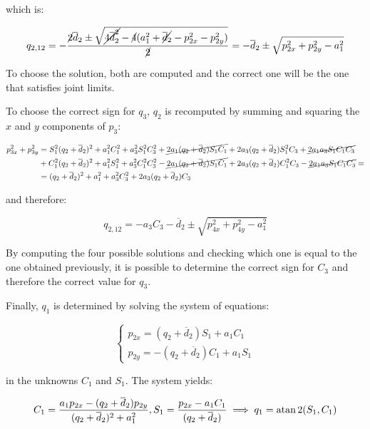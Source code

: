 which is:

\begin{equation*}
q_{2,12}=-\frac{\cancel{2}\overline d_2\pm\sqrt{\cancel{4\overline d_2^2}-\cancel{4}(a_1^2+\cancel{\overline d_2}-p_{2x}^2-p_{2y}^2)}}{\cancel{2}}=-\overline d_2\pm\sqrt{p_{2x}^2+p_{2y}^2-a_1^2}
\end{equation*}

To choose the solution, both are computed and the correct one will be the one that satisfies joint limits.

To choose the correct sign for $q_3$, $q_2$ is recomputed by summing and squaring the $x$ and $y$ components of $p_3$:

\begin{align*}
p_{3x}^2+p_{3y}^2&=S_1^2(q_2+\overline d_2)^2+a_1^2C_1^2+a_3^2S_1^2C_3^2+\cancel{2a_1(q_2+\overline d_2)S_1C_1}+2a_3(q_2+\overline d_2)S_1^2C_3+\cancel{2a_1a_3S_1C_1C_3}\\&+C_1^2(q_2+\overline d_2)^2+a_1^2S_1^2+a_3^2C_1^2C_3^2-\cancel{2a_1(q_2+\overline d_2)S_1C_1}+2a_3(q_2+\overline d_2)C_1^2C_3-\cancel{2a_1a_3S_1C_1C_3}=\\
&=(q_2+\overline d_2)^2+a_1^2+a_3^2C_3^2+2a_3(q_2+\overline d_2)C_3
\end{align*}

and therefore:

\begin{equation*}
q_{2,12}= -a_3C_3-\overline d_2\pm\sqrt{p_{4x}^2+p_{4y}^2-a_1^2}
\end{equation*}

By computing the four possible solutions and checking which one is equal to the one obtained previously, it is possible to determine the correct sign for $C_3$ and therefore the correct value for $q_3$.

Finally, $q_1$ is determined by solving the system of equations:

\begin{equation*}
\begin{cases}
p_{2x}=(q_2+\overline d_2)S_1+a_1C_1\\
p_{2y}=-(q_2+\overline d_2)C_1+a_1S_1
\end{cases}
\end{equation*}

in the unknowns $C_1$ and $S_1$. The system yields:

\begin{equation*}
C_1 = \frac{a_1p_{2x}-(q_2+\overline d_2)p_{2y}}{(q_2+\overline d_2)^2+a_1^2}, S_1=\frac{p_{2x}-a_1C_1}{(q_2+\overline d_2)}\implies q_1=\atan2(S_1,C_1)
\end{equation*}

